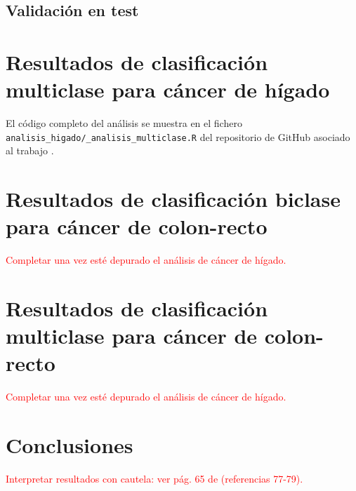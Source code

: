 \subsection{Validación en test}

\section{Resultados de clasificación multiclase para cáncer de hígado}

El código completo del análisis se muestra en el fichero \texttt{analisis\_higado/\_analisis\_multiclase.R} del repositorio de GitHub asociado al trabajo \cite{Redondo-Sanchez2020}.\\

\section{Resultados de clasificación biclase para cáncer de colon-recto}

\textcolor{red}{Completar una vez esté depurado el análisis de cáncer de hígado.}

\section{Resultados de clasificación multiclase para cáncer de colon-recto}

\textcolor{red}{Completar una vez esté depurado el análisis de cáncer de hígado.}

\section{Conclusiones}

\textcolor{red}{Interpretar resultados con cautela: ver pág. 65 de \cite{CastilloSecilla2020} (referencias 77-79).}\\
